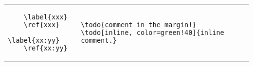\begin{tabular}{@{}l|l@{}}
  \begin{lstlisting}
    \label{xxx}
    \ref{xxx}
    \label{xx:yy}
    \ref{xx:yy}
  \end{lstlisting}&
\begin{lstlisting}
\todo{comment in the margin!}
\todo[inline, color=green!40]{inline comment.}
\end{lstlisting}
\end{tabular}



